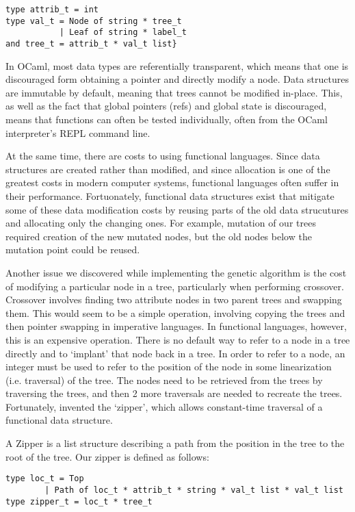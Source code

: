 \documentclass[12pt, letterpaper]{article}
\begin{document}
\begin{verbatim}
type attrib_t = int
type val_t = Node of string * tree_t
           | Leaf of string * label_t
and tree_t = attrib_t * val_t list}
\end{verbatim}

In OCaml, most data types are referentially transparent, which means that one is discouraged form obtaining a pointer and directly modify a node. Data structures are immutable by default, meaning that trees cannot be modified in-place. This, as well as the fact that global pointers (refs) and global state is discouraged, means that functions can often be tested individually, often from the OCaml interpreter's REPL command line. 

At the same time, there are costs to using functional languages. Since data structures are created rather than modified, and since allocation is one of the greatest costs in modern computer systems, functional languages often suffer in their performance. Fortuonately, functional data structures exist that mitigate some of these data modification costs by reusing parts of the old data strucutures and allocating only the changing ones. For example, mutation of our trees required creation of the new mutated nodes, but the old nodes below the mutation point could be reused. 

Another issue we discovered while implementing the genetic algorithm is the cost of modifying a particular node in a tree, particularly when performing crossover. Crossover involves finding two attribute nodes in two parent trees and swapping them. This would seem to be a simple operation, involving copying the trees and then pointer swapping in imperative languages. In functional languages, however, this is an expensive operation. There is no default way to refer to a node in a tree directly and to `implant' that node back in a tree. In order to refer to a node, an integer must be used to refer to the position of the node in some linearization (i.e. traversal) of the tree. The nodes need to be retrieved from the trees by traversing the trees, and then 2 more traversals are needed to recreate the trees. Fortunately, \cite{huet1997functional} invented the `zipper', which allows constant-time traversal of a functional data structure. 

A Zipper is a list structure describing a path from the position in the tree to the root of the tree. Our zipper is defined as follows:
\begin{verbatim}
type loc_t = Top 
        | Path of loc_t * attrib_t * string * val_t list * val_t list
type zipper_t = loc_t * tree_t
\end{verbatim}
\end{document}
